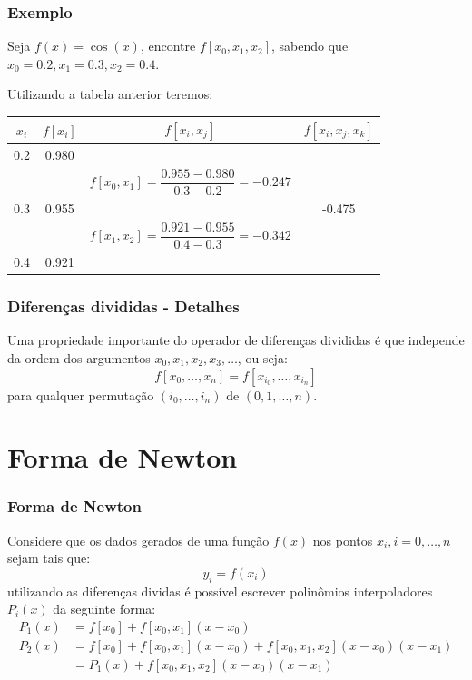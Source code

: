 \documentclass{beamer}
\theoremstyle{mystyle}
\begin{document}
\begin{frame}
	\frametitle{Exemplo}
	Seja $ f(x) =\cos(x) $, encontre $ f[x_{0},x_{1},x_{2}] $, sabendo que $ x_{0} = 0.2, x_{1} = 0.3, x_{2} = 0.4 $.
	\pause
	
	Utilizando a tabela anterior teremos:
	\begin{table}
		\small 
		\centering
		\begin{tabular}{c|c|c|c}
			$ x_{i} $ & $ f[x_{i}] $ & $ f [x_{i},x_{j}] $ & $ f [x_{i},x_{j},x_{k}] $ \\
			\hline
			\hline
			0.2 & 0.980 & &  \\
			&   & $ f[x_{0},x_{1}] = \dfrac{0.955 - 0.980}{0.3 - 0.2} = -0.247$ & \\
			0.3 & 0.955 & & -0.475 \\
			&   & $ f[x_{1},x_{2}]  =\dfrac{0.921 - 0.955}{0.4 - 0.3} = -0.342 $ & \\
			0.4 & 0.921 & &  
		\end{tabular}
	\end{table}
\end{frame}

\begin{frame}
	\frametitle{Diferenças divididas - Detalhes}
	Uma propriedade importante do operador de diferenças divididas é que independe da ordem dos argumentos $ x_{0}, x_{1}, x_{2}, x_{3}, \ldots $, ou seja:
		\begin{equation*}
			f [x_{0},\ldots,x_{n}] = f [x_{i_{0}},\ldots,x_{i_{n}}]
		\end{equation*}
		para qualquer permutação $ (i_{0},\ldots, i_{n}) $ de $ (0, 1,\ldots, n) $.
\end{frame}

\section{Forma de Newton}

\begin{frame}
	\frametitle{Forma de Newton}
	Considere que os dados gerados de uma função $ f(x) $ nos pontos $ x_{i}, i=0,\ldots,n $ sejam tais que:
		\begin{equation*}
			y_{i} = f(x_{i})
		\end{equation*}
		utilizando as diferenças dividas é possível escrever polinômios interpoladores $ P_{i}(x) $ da seguinte forma:
		\begin{align*}
			P_{1}(x) & =  f[x_{0}] + f[x_{0},x_{1}](x - x_{0})\\
			P_{2}(x) & =  f[x_{0}] + f[x_{0},x_{1}](x - x_{0}) + f[x_{0},x_{1},x_{2}](x - x_{0})(x - x_{1})\\
					 & =  P_{1}(x) + f[x_{0},x_{1},x_{2}](x - x_{0})(x - x_{1})
		\end{align*}
\end{frame}
\end{document}
